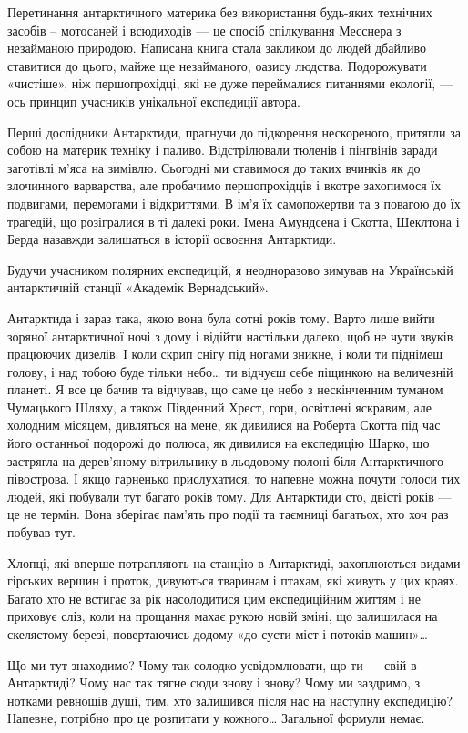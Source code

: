 Перетинання антарктичного материка без використання будь-яких технічних засобів
– мотосаней і всюдиходів --- це спосіб спілкування Месснера з незайманою
природою. Написана книга стала закликом до людей дбайливо ставитися до цього,
майже ще незайманого, оазису людства. Подорожувати «чистіше», ніж
першопрохідці, які не дуже переймалися питаннями екології, --- ось принцип
учасників унікальної експедиції автора.

Перші дослідники Антарктиди, прагнучи до підкорення нескореного, притягли за
собою на материк техніку і паливо. Відстрілювали тюленів і пінгвінів заради
заготівлі м’яса на зимівлю. Сьогодні ми ставимося до таких вчинків як до
злочинного варварства, але пробачимо першопрохідців і вкотре захопимося їх
подвигами, перемогами і відкриттями. В ім’я їх самопожертви та з повагою до їх
трагедій, що розігралися в ті далекі роки. Імена Амундсена і Скотта, Шеклтона і
Берда назавжди залишаться в історії освоєння Антарктиди.

Будучи учасником полярних експедицій, я неодноразово зимував на Українській
антарктичній станції «Академік Вернадський».

Антарктида і зараз така, якою вона була сотні років тому. Варто лише вийти
зоряної антарктичної ночі з дому і відійти настільки далеко, щоб не чути звуків
працюючих дизелів. І коли скрип снігу під ногами зникне, і коли ти піднімеш
голову, і над тобою буде тільки небо… ти відчуєш себе піщинкою на величезній
планеті. Я все це бачив та відчував, що саме це небо з нескінченним туманом
Чумацького Шляху, а також Південний Хрест, гори, освітлені яскравим, але
холодним місяцем, дивляться на мене, як дивилися на Роберта Скотта під час його
останньої подорожі до полюса, як дивилися на експедицію Шарко, що застрягла на
дерев’яному вітрильнику в льодовому полоні біля Антарктичного півострова. І
якщо гарненько прислухатися, то напевне можна почути голоси тих людей, які
побували тут багато років тому. Для Антарктиди сто, двісті років --- це не
термін. Вона зберігає пам’ять про події та таємниці багатьох, хто хоч раз
побував тут.

Хлопці, які вперше потрапляють на станцію в Антарктиді, захоплюються видами
гірських вершин і проток, дивуються тваринам і птахам, які живуть у цих краях.
Багато хто не встигає за рік насолодитися цим експедиційним життям і не
приховує сліз, коли на прощання махає рукою новій зміні, що залишилася на
скелястому березі, повертаючись додому «до суєти міст і потоків машин»… 

Що ми тут знаходимо? Чому так солодко усвідомлювати, що ти --- свій в Антарктиді?
Чому нас так тягне сюди знову і знову? Чому ми заздримо, з нотками ревнощів
душі, тим, хто залишився після нас на наступну експедицію? Напевне, потрібно
про це розпитати у кожного… Загальної формули немає.

